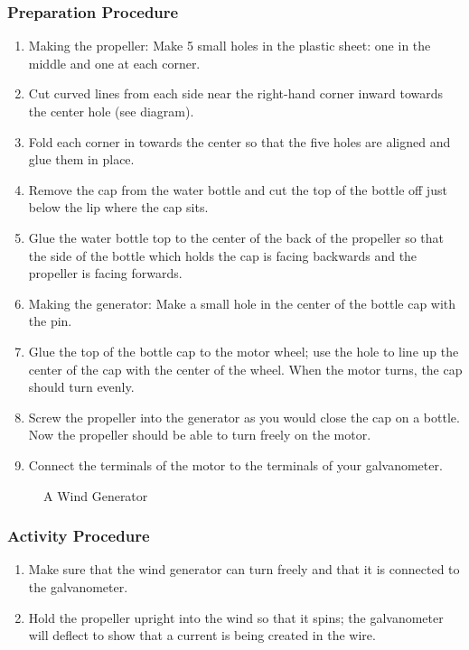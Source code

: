 \subsubsection*{Preparation Procedure}
\begin{enumerate}
\item{Making the propeller: Make 5 small holes in the plastic sheet: one in the middle and one at each corner.} 
\item{Cut curved lines from each side near the right-hand corner inward towards the center hole (see diagram).} 
\item{Fold each corner in towards the center so that the five holes are aligned and glue them in place.} 
\item{Remove the cap from the water bottle and cut the top of the bottle off just below the lip where the cap sits.} 
\item{Glue the water bottle top to the center of the back of the propeller so that the side of the bottle which holds the cap is facing backwards and the propeller is facing forwards.} 
\item{Making the generator: Make a small hole in the center of the bottle cap with the pin.} 
\item{Glue the top of the bottle cap to the motor wheel; use the hole to line up the center of the cap with the center of the wheel. When the motor turns, the cap should turn evenly.} 
\item{Screw the propeller into the generator as you would close the cap on a bottle. Now the propeller should be able to turn freely on the motor.} 
\item{Connect the terminals of the motor to the terminals of your galvanometer.} 
\end{enumerate}

\begin{figure}[h]
\begin{center}
\def\svgwidth{200pt}

\caption{A Wind Generator}
\label{fig:wind-turbine}
\end{center}
\end{figure}

\subsubsection*{Activity Procedure}
\begin{enumerate}
\item{Make sure that the wind generator can turn freely and that it is connected to the galvanometer.} 
\item{Hold the propeller upright into the wind so that it spins; the galvanometer will deflect to show that a current is being created in the wire.} 
\end{enumerate}

